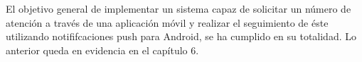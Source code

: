 El objetivo general de implementar un sistema capaz de solicitar un número de atención a
través de una aplicación móvil y realizar el seguimiento de éste utilizando notififcaciones
push para Android, se ha cumplido en su totalidad. Lo anterior queda en evidencia en el
capítulo 6.